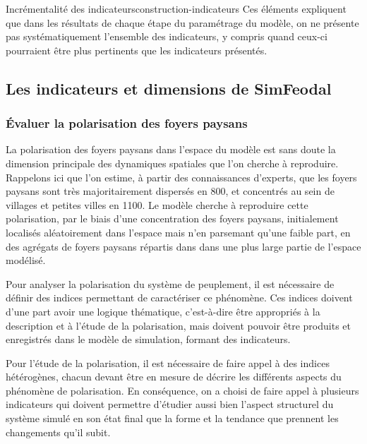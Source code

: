 \begin{encadre}{Incrémentalité des indicateurs}{construction-indicateurs}
	Ces éléments expliquent que dans les résultats de chaque étape du paramétrage du modèle, on ne présente pas systématiquement l'ensemble des indicateurs, y compris quand ceux-ci pourraient être plus pertinents que les indicateurs présentés.
\end{encadre}


\pagebreak

\subsection{Les indicateurs et dimensions de SimFeodal}

\subsubsection{Évaluer la polarisation des foyers paysans \label{subsub:polarisation}}

La polarisation des foyers paysans dans l'espace du modèle est sans doute la dimension principale des dynamiques spatiales que l'on cherche à reproduire. Rappelons ici que l'on estime, à partir des connaissances d'experts, que les foyers paysans sont très majoritairement dispersés en 800, et concentrés au sein de villages et petites villes en 1100.
Le modèle cherche à reproduire cette polarisation, par le biais d'une concentration des foyers paysans, initialement localisés aléatoirement dans l'espace mais n'en parsemant qu'une faible part, en des agrégats de foyers paysans répartis dans dans une plus large partie de l'espace modélisé.

Pour analyser la polarisation du système de peuplement, il est nécessaire de définir des indices permettant de caractériser ce phénomène. Ces indices doivent d'une part avoir une logique thématique, c'est-à-dire être appropriés à la description et à l'étude de la polarisation, mais doivent  pouvoir être produits et enregistrés dans le modèle de simulation, formant des indicateurs.

Pour l'étude de la polarisation, il est nécessaire de faire appel à des indices hétérogènes, chacun devant être en mesure de décrire les différents aspects du phénomène de polarisation. En conséquence, on a choisi de faire appel à plusieurs indicateurs qui doivent permettre d'étudier aussi bien l'aspect structurel du système simulé en son état final que la forme et la tendance que prennent les changements qu'il subit.

